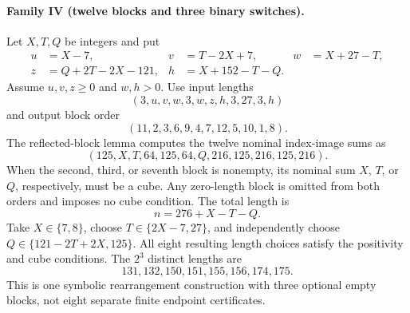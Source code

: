 \documentclass[10pt]{article}
\begin{document}
\paragraph{Family IV (twelve blocks and three binary switches).}
Let $X,T,Q$ be integers and put
\[
\begin{aligned}
u&=X-7,&v&=T-2X+7,&w&=X+27-T,\\
z&=Q+2T-2X-121,&h&=X+152-T-Q.
\end{aligned}
\]
Assume $u,v,z\ge0$ and $w,h>0$.
Use input lengths
\[
(3,u,v,w,3,w,z,h,3,27,3,h)
\]
and output block order
\[
(11,2,3,6,9,4,7,12,5,10,1,8).
\]
The reflected-block lemma computes the twelve
nominal index-image sums as
\[
(125,X,T,64,125,64,Q,216,125,216,125,216).
\]
When the second, third, or seventh block is nonempty,
its nominal sum $X$, $T$, or $Q$, respectively,
must be a cube. Any zero-length block is omitted
from both orders and imposes no cube condition.
The total length is
\[
n=276+X-T-Q.
\]
Take $X\in\{7,8\}$, choose
$T\in\{2X-7,27\}$, and independently choose
$Q\in\{121-2T+2X,125\}$. All eight resulting
length choices satisfy the positivity and cube
conditions. The $2^3$ distinct lengths are
\[
\boxed{131,132,150,151,155,156,174,175}.
\]
This is one symbolic rearrangement construction
with three optional empty blocks, not eight
separate finite endpoint certificates.
\end{document}
